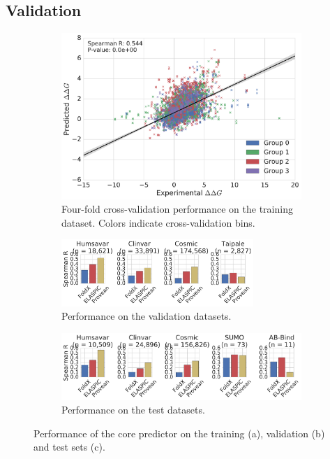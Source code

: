 \subsection{Validation}

\begin{figure}[ht]

	\begin{subfigure}[b]{1.0\textwidth}
		\centering
		\includegraphics[width=0.6\linewidth]{static/elaspic_training_set/validation/crossvalidation_performance_core.pdf}
		\caption{Four-fold cross-validation performance on the training dataset. Colors indicate cross-validation bins.}
		\vspace*{10mm}
	\end{subfigure}

	\begin{subfigure}[b]{1.0\textwidth}
		\centering
		\includegraphics[width=0.8\textwidth]{static/elaspic_training_set/validation/validation_performance_core.pdf}
		\caption{Performance on the validation datasets.}
		\vspace*{10mm}
	\end{subfigure}

	\begin{subfigure}[b]{1.0\textwidth}
		\centering
		\includegraphics[width=1.0\textwidth]{static/elaspic_training_set/validation/test_performance_core.pdf}
		\caption{Performance on the test datasets.}
	\end{subfigure}

	\caption{Performance of the core predictor on the training (a), validation (b) and test sets (c).}
\end{figure}




